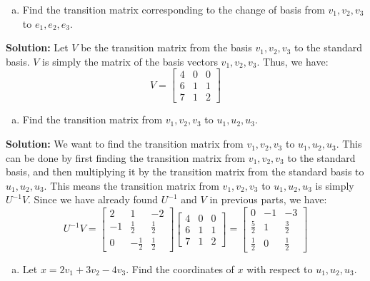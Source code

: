 \documentclass{article}
\begin{document}
\begin{enumerate}[(b)]
    \item
    Find the transition matrix corresponding to the change of basis from ${v_1, v_2, v_3}$ to ${e_1, e_2, e_3}$.
\end{enumerate}

\noindent\textbf{Solution:}
Let $V$ be the transition matrix from the basis ${v_1, v_2, v_3}$ to the standard basis.
$V$ is simply the matrix of the basis vectors ${v_1, v_2, v_3}$.
Thus, we have:
$$ V = \begin{bmatrix} 4 & 0 & 0 \\ 6 & 1 & 1 \\ 7 & 1 & 2 \end{bmatrix} $$

\newpage
\begin{enumerate}[(c)]
    \item
    Find the transition matrix from ${v_1, v_2, v_3}$ to ${u_1, u_2, u_3}$.
\end{enumerate}

\noindent\textbf{Solution:}
We want to find the transition matrix from ${v_1, v_2, v_3}$ to ${u_1, u_2, u_3}$.
This can be done by first finding the transition matrix from ${v_1, v_2, v_3}$ to the standard basis, and then multiplying it by the transition matrix from the standard basis to ${u_1, u_2, u_3}$.
This means the transition matrix from ${v_1, v_2, v_3}$ to ${u_1, u_2, u_3}$ is simply $U^{-1}V$.
Since we have already found $U^{-1}$ and $V$ in previous parts, we have:
$$ U^{-1}V = 
\begin{bmatrix} 2 & 1 & -2 \\ -1 & \frac{1}{2} & \frac{1}{2} \\ 0 & -\frac{1}{2} & \frac{1}{2} \end{bmatrix} 
\begin{bmatrix} 4 & 0 & 0 \\ 6 & 1 & 1 \\ 7 & 1 & 2 \end{bmatrix}
=
\begin{bmatrix} 0 & -1 & -3 \\ \frac{5}{2} & 1 & \frac{3}{2} \\ \frac{1}{2} & 0 & \frac{1}{2} \end{bmatrix}
$$
\newline

\begin{enumerate}[(d)]
    \item
    Let $x = 2v_1 + 3v_2 - 4v_3$. Find the coordinates of $x$ with respect to ${u_1, u_2, u_3}$.
\end{enumerate}
\end{document}
